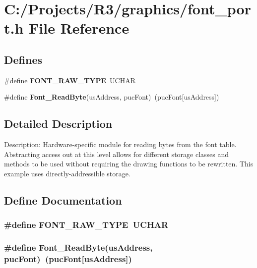 \section{C:/Projects/R3/graphics/font\_\-port.h File Reference}
\label{font__port_8h}
\subsection*{Defines}
\begin{DoxyCompactItemize}
\item 
\#define {\bf FONT\_\-RAW\_\-TYPE}~UCHAR
\item 
\#define {\bf Font\_\-ReadByte}(usAddress, pucFont)~(pucFont[usAddress])
\end{DoxyCompactItemize}


\subsection{Detailed Description}
Description: Hardware-\/specific module for reading bytes from the font table. Abstracting access out at this level allows for different storage classes and methods to be used without requiring the drawing functions to be rewritten. This example uses directly-\/addressible storage. 

\subsection{Define Documentation}
\subsubsection[{FONT\_\-RAW\_\-TYPE}]{\setlength{\rightskip}{0pt plus 5cm}\#define FONT\_\-RAW\_\-TYPE~UCHAR}\label{font__port_8h_af44a13ffc9c739c3214e64e8e4060a8c}
\subsubsection[{Font\_\-ReadByte}]{\setlength{\rightskip}{0pt plus 5cm}\#define Font\_\-ReadByte(usAddress, \/  pucFont)~(pucFont[usAddress])}\label{font__port_8h_a46876e3d6b7c7a63fce650eb99619a92}
